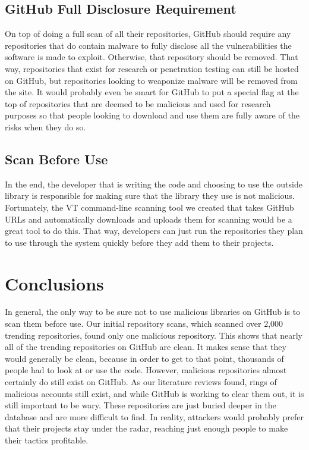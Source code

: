 \documentclass[]{acmart}
\begin{document}
\subsection{GitHub Full Disclosure Requirement}
On top of doing a full scan of all their repositories, GitHub should require any repositories that do contain malware to fully disclose all the vulnerabilities the software is made to exploit. Otherwise, that repository should be removed. That way, repositories that exist for research or penetration testing can still be hosted on GitHub, but repositories looking to weaponize malware will be removed from the site. It would probably even be smart for GitHub to put a special flag at the top of repositories that are deemed to be malicious and used for research purposes so that people looking to download and use them are fully aware of the risks when they do so.
\subsection{Scan Before Use}
In the end, the developer that is writing the code and choosing to use the outside library is responsible for making sure that the library they use is not malicious. Fortunately, the VT command-line scanning tool we created that takes GitHub URLs and automatically downloads and uploads them for scanning would be a great tool to do this. That way, developers can just run the repositories they plan to use through the system quickly before they add them to their projects.
\section{Conclusions}
In general, the only way to be sure not to use malicious libraries on GitHub is to scan them before use. Our initial repository scans, which scanned over 2,000 trending repositories, found only one malicious repository. This shows that nearly all of the trending repositories on GitHub are clean. It makes sense that they would generally be clean, because in order to get to that point, thousands of people had to look at or use the code. However, malicious repositories almost certainly do still exist on GitHub. As our literature reviews found, rings of malicious accounts still exist, and while GitHub is working to clear them out, it is still important to be wary. These repositories are just buried deeper in the database and are more difficult to find. In reality, attackers would probably prefer that their projects stay under the radar, reaching just enough people to make their tactics profitable.
\end{document}
